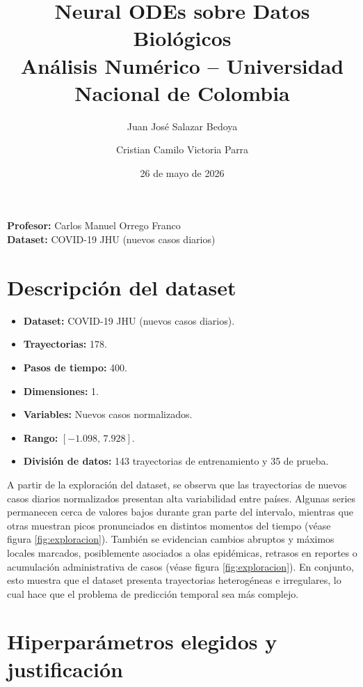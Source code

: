 \documentclass[11pt,letterpaper]{article}
\title{\textbf{Neural ODEs sobre Datos Biológicos}\\
\large Análisis Numérico -- Universidad Nacional de Colombia}
\author{Juan José Salazar Bedoya \and Cristian Camilo Victoria Parra}
\date{26 de mayo de 2026}
\begin{document}
\maketitle

\begin{center}
\textbf{Profesor:} Carlos Manuel Orrego Franco\\
\textbf{Dataset:} COVID-19 JHU (nuevos casos diarios)
\end{center}

\section{Descripción del dataset}

\begin{itemize}
    \item \textbf{Dataset:} COVID-19 JHU (nuevos casos diarios).
    \item \textbf{Trayectorias:} 178.
    \item \textbf{Pasos de tiempo:} 400.
    \item \textbf{Dimensiones:} 1.
    \item \textbf{Variables:} Nuevos casos normalizados.
    \item \textbf{Rango:} $[-1.098,\,7.928]$.
    \item \textbf{División de datos:} 143 trayectorias de entrenamiento y 35 de prueba.
\end{itemize}

A partir de la exploración del dataset, se observa que las trayectorias de nuevos casos diarios normalizados presentan alta variabilidad entre países. Algunas series permanecen cerca de valores bajos durante gran parte del intervalo, mientras que otras muestran picos pronunciados en distintos momentos del tiempo (véase figura \ref{fig:exploracion}). También se evidencian cambios abruptos y máximos locales marcados, posiblemente asociados a olas epidémicas, retrasos en reportes o acumulación administrativa de casos (véase figura \ref{fig:exploracion}). En conjunto, esto muestra que el dataset presenta trayectorias heterogéneas e irregulares, lo cual hace que el problema de predicción temporal sea más complejo.

\section{Hiperparámetros elegidos y justificación}
\end{document}
